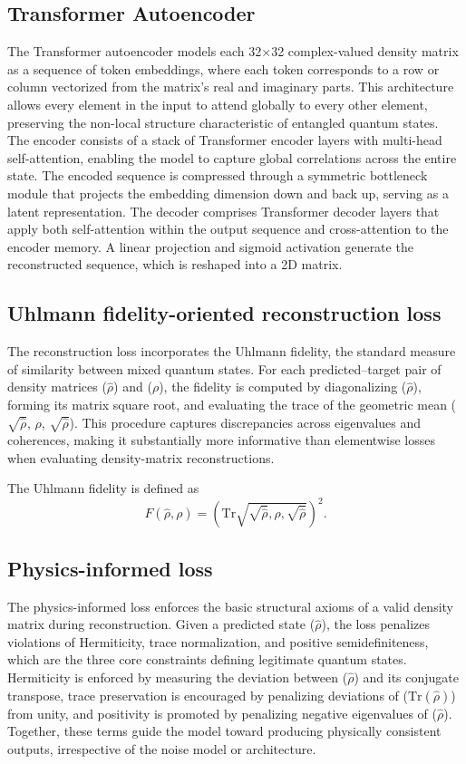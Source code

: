 \documentclass[11pt]{article}
\begin{document}
\subsection{Transformer Autoencoder}
\label{sec:orge051e53}
The Transformer autoencoder models each 32×32 complex-valued density matrix as a sequence of token embeddings, where each token corresponds to a row or column vectorized from the matrix’s real and imaginary parts. This architecture allows every element in the input to attend globally to every other element, preserving the non-local structure characteristic of entangled quantum states. The encoder consists of a stack of Transformer encoder layers with multi-head self-attention, enabling the model to capture global correlations across the entire state. The encoded sequence is compressed through a symmetric bottleneck module that projects the embedding dimension down and back up, serving as a latent representation. The decoder comprises Transformer decoder layers that apply both self-attention within the output sequence and cross-attention to the encoder memory. A linear projection and sigmoid activation generate the reconstructed sequence, which is reshaped into a 2D matrix.
\subsection{Uhlmann fidelity-oriented reconstruction loss}
\label{sec:org8321778}
The reconstruction loss incorporates the Uhlmann fidelity, the standard measure of similarity between mixed quantum states. For each predicted–target pair of density matrices (\(\hat{\rho}\)) and (\(\rho\)), the fidelity is computed by diagonalizing (\(\hat{\rho}\)), forming its matrix square root, and evaluating the trace of the geometric mean (\(\sqrt{\hat{\rho}}\), \(\rho\), \(\sqrt{\hat{\rho}}\)). This procedure captures discrepancies across eigenvalues and coherences, making it substantially more informative than elementwise losses when evaluating density-matrix reconstructions.

The Uhlmann fidelity is defined as
$$
F(\hat{\rho}, \rho)
= \left( \mathrm{Tr}\sqrt{\sqrt{\hat{\rho}},\rho,\sqrt{\hat{\rho}}}\right)^2 .
$$
\subsection{Physics-informed loss}
\label{sec:orga47d32e}

The physics-informed loss enforces the basic structural axioms of a valid density matrix during reconstruction. Given a predicted state (\(\hat{\rho}\)), the loss penalizes violations of Hermiticity, trace normalization, and positive semidefiniteness, which are the three core constraints defining legitimate quantum states. Hermiticity is enforced by measuring the deviation between (\(\hat{\rho}\)) and its conjugate transpose, trace preservation is encouraged by penalizing deviations of (\(\mathrm{Tr}(\hat{\rho})\)) from unity, and positivity is promoted by penalizing negative eigenvalues of (\(\hat{\rho}\)). Together, these terms guide the model toward producing physically consistent outputs, irrespective of the noise model or architecture.
\end{document}
